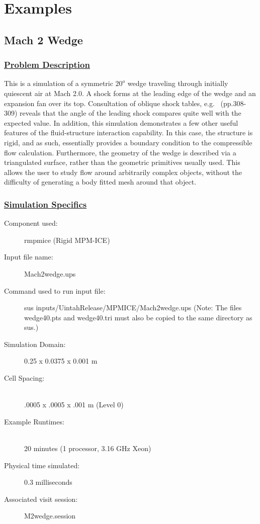 \newpage

\section{Examples} \label {Sec:MPMICE_EXAMPLES}

\subsection*{\center Mach 2 Wedge}
\subsubsection*{\underline{Problem Description}}
This is a simulation of a symmetric $20^o$ wedge traveling through initially
quiescent air at Mach 2.0.  A shock forms at the leading edge of the
wedge and an expansion fan over its top.  Consultation of oblique shock
tables, e.g.~\cite{ref:Saad} (pp.308-309) reveals that the angle of the leading
shock compares quite well with the expected value.  In addition, this
simulation demonstrates a few other useful features of the fluid-structure
interaction capability.  In this case, the structure is rigid, and as
such, essentially provides a boundary condition to the compressible flow
calculation.  Furthermore, the geometry of the wedge is described via a
triangulated surface, rather than the geometric primitives usually used.
This allows the user to study flow around arbitrarily complex objects,
without the difficulty of generating a body fitted mesh around that object.

\subsubsection*{\underline{Simulation Specifics}}
\begin{description}
\item [Component used:] \hfill rmpmice (Rigid MPM-ICE)
\item [Input file name:] \hfill Mach2wedge.ups
\item [Command used to run input file:]\hfill sus inputs/UintahRelease/MPMICE/Mach2wedge.ups
(Note: The files wedge40.pts and wedge40.tri must also be copied to
the same directory as sus.)

\item [Simulation Domain:]\hfill    0.25 x 0.0375 x 0.001 m

\item [Cell Spacing:]\hfill \\
.0005 x .0005 x .001 m (Level 0)

\item [Example Runtimes:] \hfill \\
 20 minutes   (1 processor, 3.16 GHz Xeon)\\

\item [Physical time simulated:] \hfill 0.3 milliseconds

\item [Associated visit session:] \hfill M2wedge.session

\end{description}

